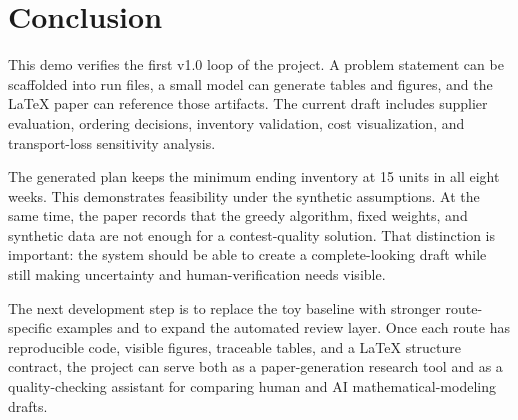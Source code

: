 \section{Conclusion}

This demo verifies the first v1.0 loop of the project. A problem statement can be scaffolded into run files, a small model can generate tables and figures, and the LaTeX paper can reference those artifacts. The current draft includes supplier evaluation, ordering decisions, inventory validation, cost visualization, and transport-loss sensitivity analysis.

The generated plan keeps the minimum ending inventory at 15 units in all eight weeks. This demonstrates feasibility under the synthetic assumptions. At the same time, the paper records that the greedy algorithm, fixed weights, and synthetic data are not enough for a contest-quality solution. That distinction is important: the system should be able to create a complete-looking draft while still making uncertainty and human-verification needs visible.

The next development step is to replace the toy baseline with stronger route-specific examples and to expand the automated review layer. Once each route has reproducible code, visible figures, traceable tables, and a LaTeX structure contract, the project can serve both as a paper-generation research tool and as a quality-checking assistant for comparing human and AI mathematical-modeling drafts.
